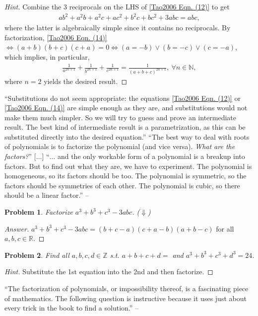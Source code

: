 \documentclass[oneside]{book}
\numberwithin{equation}{section}
\newtheorem{problem}{Problem}[section]
\begin{document}
\begin{proof}[Hint] Combine the 3 reciprocals on the LHS of \eqref{Tao2006 Eqn. (12)} to get
	\begin{align}
		\label{Tao2006 Eqn. (14)}
		ab^2 + a^2b + a^2c + ac^2 + b^2c + bc^2 + 3abc = abc,
	\end{align}
	where the latter is algebraically simple since it contains no reciprocals. By factorization, \eqref{Tao2006 Eqn. (14)} $\Leftrightarrow(a + b)(b + c)(c + a) = 0\Leftrightarrow(a = -b)\lor(b = -c)\lor(c = -a)$, which implies, in particular,
	\begin{align*}
		\frac{1}{a^{2n+1}} + \frac{1}{b^{2n+1}} + \frac{1}{c^{2n+1}} = \frac{1}{(a + b + c)^{2n + 1}},\ \forall n\in\mathbb{N},
	\end{align*}
	where $n = 2$ yields the desired result.
\end{proof}
``Substitutions do not seem appropriate: the equations \eqref{Tao2006 Eqn. (12)} or \eqref{Tao2006 Eqn. (14)} are simple enough as they are, and substitutions would not make them much simpler. So we will try to guess and prove an intermediate result. The best kind of intermediate result is a parametrization, as this can be substituted directly into the desired equation.'' ``The best way to deal with roots of polynomials is to factorize the polynomial (and vice versa). \textit{What are the factors?}'' [$\ldots$] ``$\ldots$ and the only workable form of a polynomial is a breakup into factors. But to find out what they are, we have to experiment. The polynomial is homogeneous, so its factors should be too. The polynomial is symmetric, so the factors should be symmetries of each other. The polynomial is cubic, so there should be a linear factor.'' -- \cite[p. 44]{Tao2006}

\begin{problem}
	Factorize $a^3 + b^3 + c^3 - 3abc$. \emph{($\Downarrow$)}
\end{problem}

\begin{proof}[Answer]
	$a^3 + b^3 + c^3 - 3abc = (b + c - a)(c + a - b)(a + b - c)$ for all $a,b,c\in\mathbb{R}$.
\end{proof}

\begin{problem}
	Find all $a,b,c,d\in\mathbb{Z}$ s.t. $a + b + c + d = $ and $a^3 + b^3 + c^3 + d^3 = 24$.
\end{problem}

\begin{proof}[Hint]
	Substitute the 1st equation into the 2nd and then factorize.
\end{proof}
``The factorization of polynomials, or impossibility thereof, is a fascinating piece of mathematics. The following question is instructive because it uses just about every trick in the book to find a solution.'' -- \cite[p. 45]{Tao2006}
\end{document}
